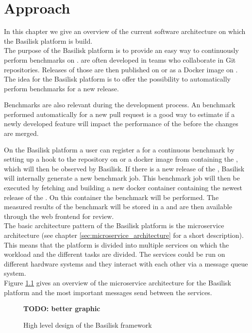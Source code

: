 \chapter{Approach}
\label{ch:approach}

In this chapter we give an overview of the current software architecture on which the Basilisk platform is build.
\\

The purpose of the Basilisk platform is to provide an easy way to continuously perform benchmarks on \tsp{}.
\tsp{} are often developed in teams who collaborate in Git repositories.
Releases of those \tsp{} are then published on \gh{} or as a Docker image on \dockh{}.
The idea for the Basilisk platform is to offer the possibility to automatically perform benchmarks for a new \ts{} release.

Benchmarks are also relevant during the development process.
An benchmark performed automatically for \eg{} a new pull request is a good way to estimate if a newly developed feature will impact the performance of the \ts{} before the changes are merged.

On the Basilisk platform a user can register a \ts{} for a continuous benchmark by setting up a hook to the repository on \gh{} or a docker image from \dockh{} containing the \ts{}, which will then be observed by Basilisk.
If there is a new release of the \ts{}, Basilisk will internally generate a new benchmark job.
This benchmark job will then be executed by fetching and building a new docker container containing the newest release of the \ts{}.
On this container the benchmark will be performed.
The measured results of the benchmark will be stored in a \ts{} and are then available through the web frontend for review.
\\

The basic architecture pattern of the Basilisk platform is the microservice architecture (see chapter \ref{sec:microservice_architecture} for a short description). 
This means that the platform is divided into multiple services on which the workload and the different tasks are divided.
The services could be run on different hardware systems and they interact with each other via a message queue system.
\\

Figure \ref{fig:basilisk_high_level_design} gives an overview of the microservice architecture for the Basilisk platform and the most important messages send between the services.
\begin{figure}[tbph]
	\centering
	\textbf{TODO: better graphic}
	\caption{High level design of the Basilisk framework}
	\label{fig:basilisk_high_level_design}
\end{figure}
\\

